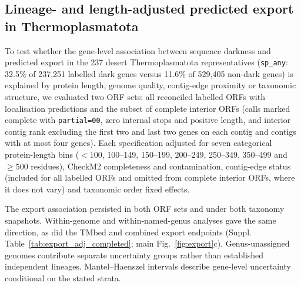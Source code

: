 \subsection*{Lineage- and length-adjusted predicted export in Thermoplasmatota}
To test whether the gene-level association between sequence darkness and predicted export in the 237 desert Thermoplasmatota representatives (\texttt{sp\_any}: 32.5\% of 237,251 labelled dark genes versus 11.6\% of 529,405 non-dark genes) is explained by protein length, genome quality, contig-edge proximity or taxonomic structure, we evaluated two ORF sets: all reconciled labelled ORFs with localisation predictions and the subset of complete interior ORFs (calls marked complete with \texttt{partial=00}, zero internal stops and positive length, and interior contig rank excluding the first two and last two genes on each contig and contigs with at most four genes). Each specification adjusted for seven categorical protein-length bins ($<100$, 100--149, 150--199, 200--249, 250--349, 350--499 and $\geq 500$ residues), CheckM2 completeness and contamination, contig-edge status (included for all labelled ORFs and omitted from complete interior ORFs, where it does not vary) and taxonomic order fixed effects.

The export association persisted in both ORF sets and under both taxonomy snapshots. Within-genome and within-named-genus analyses gave the same direction, as did the TMbed and combined export endpoints (Suppl. Table~\ref{tab:export_adj_completed}; main Fig.~\ref{fig:export}c). Genus-unassigned genomes contribute separate uncertainty groups rather than established independent lineages. Mantel--Haenszel intervals describe gene-level uncertainty conditional on the stated strata.

